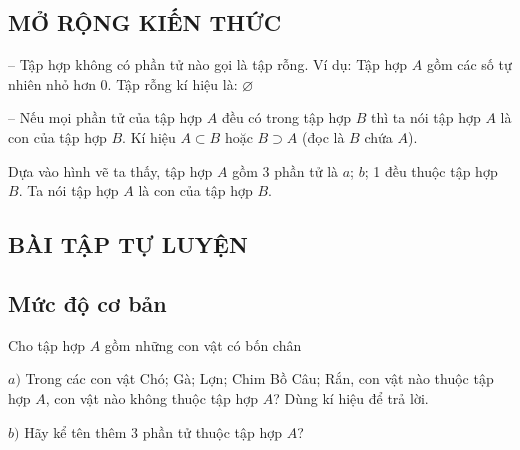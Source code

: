 \subsection{MỞ RỘNG KIẾN THỨC}
-- Tập hợp không có phần tử nào gọi là tập rỗng. Ví dụ: Tập hợp $A$ gồm các số tự nhiên nhỏ hơn $0$. Tập rỗng kí hiệu là: $\varnothing $

-- Nếu mọi phần tử của tập hợp $A$ đều có trong tập hợp $B$ thì ta nói tập hợp $A$ là con của tập hợp $B$. Kí hiệu $A\subset B$ hoặc $B\supset A$ (đọc là $B$ chứa $A$).

Dựa vào hình vẽ ta thấy, tập hợp $A$ gồm $3$ phần tử là $a$; $b$; 1 đều thuộc tập hợp $B$. Ta nói tập hợp $A$ là con của tập hợp $B$.



\subsection{BÀI TẬP TỰ LUYỆN}

\subsection*{Mức độ cơ bản}
\begin{bt}
	Cho tập hợp $A$ gồm những con vật có bốn chân
	
	$a)$ Trong các con vật Chó; Gà; Lợn; Chim Bồ Câu; Rắn, con vật nào thuộc tập hợp $A$, con vật nào không thuộc tập hợp $A$? Dùng kí hiệu để trả lời.
	
	$b)$ Hãy kể tên thêm $3$ phần tử thuộc tập hợp $A$?
\end{bt}

